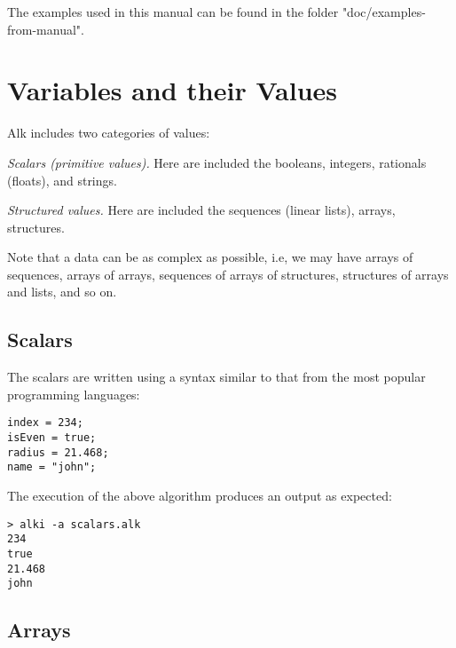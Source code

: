 \documentclass[a4paper]{report}
\begin{document}
The examples used in this manual can be found in the folder "doc/examples-from-manual".

\section{Variables and their Values}

Alk includes two categories of values:
\begin{list}{}{3ex}
\item[\it Scalars (primitive values).] Here are included the booleans, integers, rationals (floats), and strings. 
\item[\it Structured values.] Here are included the  sequences (linear lists), arrays, structures. 
\end{list} 
Note that a data can be as complex as possible, i.e, we may have arrays of sequences, arrays of arrays, sequences of arrays of structures, structures of arrays and lists, and so on.

\subsection{Scalars}

The scalars are written using a syntax similar to that from the most popular programming languages: 
\begin{verbatim}
index = 234;
isEven = true;
radius = 21.468;
name = "john";
\end{verbatim}
The execution of the above algorithm produces an output as expected:
\begin{verbatim}
> alki -a scalars.alk
234
true
21.468
john
\end{verbatim}


\subsection{Arrays}
\end{document}
